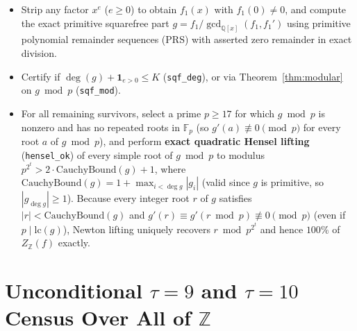 \documentclass[11pt]{article}
\newcommand{\Z}{\mathbb{Z}}
\newcommand{\Q}{\mathbb{Q}}
\newcommand{\F}{\mathbb{F}}
\newcommand{\code}[1]{\texttt{#1}}
\begin{document}
\begin{enumerate}[label=(\arabic*),leftmargin=1.8em]
\begin{itemize}[leftmargin=1.5em]
    \item Strip any factor $x^e$ ($e \ge 0$) to obtain $f_1(x)$ with $f_1(0) \neq 0$, and compute the exact primitive squarefree part $g = f_1 / \gcd_{\Q[x]}(f_1, f_1')$ using primitive polynomial remainder sequences (PRS) with asserted zero remainder in exact division.
    \item Certify if $\deg(g) + \mathbf{1}_{e > 0} \le K$ (\code{sqf\_deg}), or via Theorem~\ref{thm:modular} on $g \bmod p$ (\code{sqf\_mod}).
    \item For all remaining survivors, select a prime $p \ge 17$ for which $g \bmod p$ is nonzero and has no repeated roots in $\F_p$ (so $g'(a) \not\equiv 0 \pmod p$ for every root $a$ of $g \bmod p$), and perform \textbf{exact quadratic Hensel lifting} (\code{hensel\_ok}) of every simple root of $g \bmod p$ to modulus $p^{2^t} > 2 \cdot \mathrm{CauchyBound}(g) + 1$, where $\mathrm{CauchyBound}(g) = 1 + \max_{i < \deg g} |g_i|$ (valid since $g$ is primitive, so $|g_{\deg g}| \ge 1$). Because every integer root $r$ of $g$ satisfies $|r| < \mathrm{CauchyBound}(g)$ and $g'(r) \equiv g'(r \bmod p) \not\equiv 0 \pmod p$ (even if $p \mid \mathrm{lc}(g)$), Newton lifting uniquely recovers $r \bmod p^{2^t}$ and hence $100\%$ of $Z_{\Z}(f)$ exactly.
  \end{itemize}
\end{enumerate}

\section{Unconditional $\tau = 9$ and $\tau = 10$ Census Over All of $\Z$}\label{sec:census}
\end{document}
